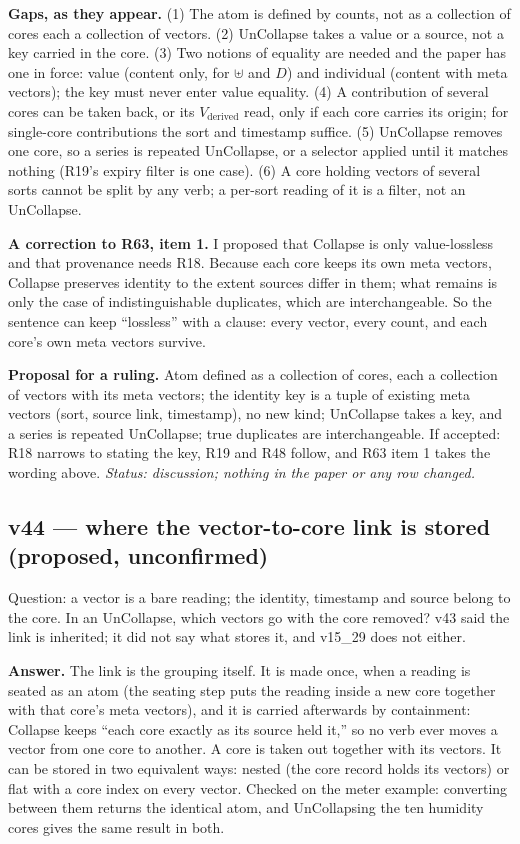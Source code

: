 \documentclass[11pt]{article}
\begin{document}
\textbf{Gaps, as they appear.} (1) The atom is defined by counts, not as a collection of cores each a collection of vectors. (2) UnCollapse takes a value or a source, not a key carried in the core. (3) Two notions of equality are needed and the
paper has one in force: value (content only, for $\uplus$ and $D$) and individual (content with meta vectors); the key must never enter value equality. (4) A contribution of several cores can be taken back, or its
$V_{\text{derived}}$ read, only if each core carries its origin; for single-core contributions the sort and timestamp suffice. (5) UnCollapse removes one core, so a series is repeated UnCollapse, or a selector applied until it matches nothing (R19's expiry filter is one case).
(6) A core holding vectors of several sorts cannot be split by any verb; a per-sort reading of it is a filter, not an UnCollapse.

\textbf{A correction to R63, item 1.} I proposed that Collapse is only value-lossless and that provenance needs R18. Because each core keeps its own meta vectors, Collapse preserves identity to the extent sources differ in them; what remains is only
the case of indistinguishable duplicates, which are interchangeable. So the sentence can keep ``lossless'' with a clause: every vector, every count, and each core's own meta vectors survive.

\textbf{Proposal for a ruling.} Atom defined as a collection of cores, each a collection of vectors with its meta vectors; the identity key is a tuple of existing meta vectors (sort, source link, timestamp), no new kind; UnCollapse takes a key, and a series is
repeated UnCollapse; true duplicates are interchangeable. If accepted: R18 narrows to stating the key, R19 and R48 follow, and R63 item 1 takes the wording above.
\emph{Status: discussion; nothing in the paper or any row changed.}


\subsection*{v44 --- where the vector-to-core link is stored (proposed, unconfirmed)}
Question: a vector is a bare reading; the identity, timestamp and source belong to the core. In an UnCollapse, which vectors go with the core removed? v43 said the link is
inherited; it did not say what stores it, and v15\_29 does not either.

\textbf{Answer.} The link is the grouping itself. It is made once, when a reading is seated as an atom (the seating step puts the reading inside a new core together with that core's meta vectors), and it is
carried afterwards by containment: Collapse keeps ``each core exactly as its source held it,'' so no verb ever moves a vector from one core to another. A core is taken out together with its vectors.
It can be stored in two equivalent ways: nested (the core record holds its vectors) or flat with a core index on every vector. Checked on the meter example: converting between them returns the identical atom, and UnCollapsing the ten humidity cores
gives the same result in both.
\end{document}
